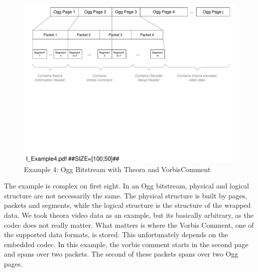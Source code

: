\begin{figure}[H]
\centering
\includegraphics[width=1.00\textwidth]{figures/I_Example4.pdf}
\caption{Example 4: Ogg Bitstream with Theora and VorbisComment}
\label{fig:Example4MP3filewithtwoID3tags}
\end{figure}

The example is complex on first sight. In an Ogg bitstream, physical and logical structure are not necessarily the same. The physical structure is built by pages, packets and segments, while the logical structure is the structure of the wrapped data. We took theora video data as an example, but its basically arbitrary, as the codec does not really matter. What matters is where the Vorbis Comment, one of the supported data formats, is stored. This unfortunately depends on the embedded codec. In this example, the vorbis comment starts in the second page and spans over two packets. The second of these packets spans over two Ogg pages.




